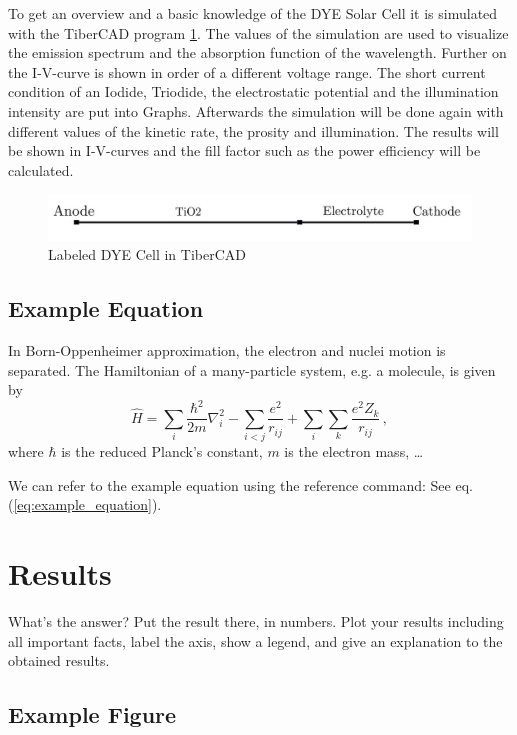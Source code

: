 \documentclass[%
 reprint,
 superscriptaddress,
 amsmath,amssymb,
pra,
]{revtex4-1}
\begin{document}
To get an overview and a basic knowledge of the DYE Solar Cell it is simulated with the TiberCAD program \ref{fig:DYE_Sim}. The values of the simulation are used to visualize the emission spectrum and the absorption function of the wavelength. Further on the I-V-curve is shown in order of a different voltage range. The short current condition of an Iodide, Triodide, the electrostatic potential and the illumination intensity are put into Graphs. Afterwards the simulation will be done again with different values of the kinetic rate, the prosity and illumination. The results will be shown in I-V-curves and the fill factor such as the power efficiency will be calculated.  
\\ 
\begin{figure}[h]
	\centering
	\includegraphics[width=\columnwidth]{grafik/DYE_Sim}
	\caption{Labeled DYE Cell in TiberCAD}
	\label{fig:DYE_Sim}
\end{figure}

\subsection*{Example Equation}
In Born-Oppenheimer approximation, the electron and nuclei motion is separated. The Hamiltonian of a many-particle system, e.g. a molecule, is given by
\begin{equation}
\label{eq:example_equation}
    \hat{H} = \sum_i \frac{\hbar^2}{2m}\nabla_i^2 - \sum_{i<j}\frac{e^2}{r_{ij}} + \sum_{i}\sum_{k}\frac{e^2 Z_{k}}{r_{ij}} \,,
\end{equation}
where $\hbar$ is the reduced Planck's constant, $m$ is the electron mass, \dots 

We can refer to the example equation using the reference command: See eq. (\ref{eq:example_equation}).

\section{Results}
\label{sec:results}

What's the answer? Put the result there, in numbers. Plot your results including all important facts, label the axis, show a legend, and give an explanation to the obtained results.

\subsection*{Example Figure}
\end{document}
